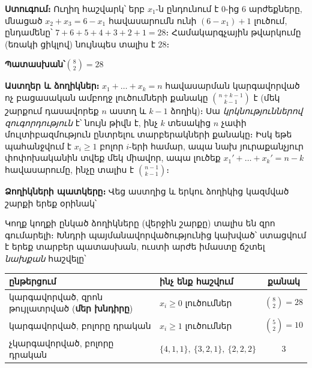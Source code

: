 \documentclass[11pt,a4paper]{article}
\newcommand{\answer}[1]{\begin{answerbox}\centering\textbf{Պատասխան՝}\quad #1\end{answerbox}}
\begin{document}
\textbf{Ստուգում։} Ուղիղ հաշվարկ՝ երբ $x_1$-ն ընդունում է $0$-ից $6$ արժեքները, մնացած
$x_2+x_3=6-x_1$ հավասարումն ունի $(6-x_1)+1$ լուծում, ընդամենը՝ $7+6+5+4+3+2+1=28$։ Համակարգչային
թվարկումը (եռակի ցիկլով) նույնպես տալիս է $28$։ \checkmark

\answer{$\displaystyle \binom{8}{2}=28$}

\begin{methodbox}
\textbf{Աստղեր և ձողիկներ։} $x_1+\dots+x_k=n$ հավասարման կարգավորված ոչ
բացասական ամբողջ լուծումների քանակը $\binom{n+k-1}{k-1}$ է (մեկ շարքում դասավորեք $n$ աստղ
և $k-1$ ձողիկ)։ Սա \emph{կրկնություններով զուգորդություն} է՝ նույն թիվն է, ինչ $k$ տեսակից $n$ չափի
մուլտիբազմություն ընտրելու տարբերակների քանակը։ Իսկ եթե պահանջվում է $x_i\ge 1$ բոլոր $i$-երի
համար, ապա նախ յուրաքանչյուր փոփոխականին տվեք մեկ միավոր, ապա լուծեք $x_1'+\dots+x_k'=n-k$
հավասարումը, ինչը տալիս է $\binom{n-1}{k-1}$։
\end{methodbox}

\medskip
\textbf{Ձողիկների պատկերը։} Վեց աստղից և երկու ձողիկից կազմված շարքի երեք օրինակ՝

\begin{center}
\end{center}
Կողք կողքի ընկած ձողիկները (վերջին շարքը) տալիս են զրո գումարելի։ Խնդրի պայմանավորվածությունից
կախված՝ ստացվում է երեք տարբեր պատասխան, ուստի արժե իմաստը ճշտել \emph{նախքան} հաշվելը՝

\begin{center}
\small
\begin{tabular}{@{}llc@{}}
\toprule
ընթերցում & ինչ ենք հաշվում & քանակ\\
\midrule
կարգավորված, զրոն թույլատրված (\textbf{մեր խնդիրը}) & $x_i\ge 0$ լուծումներ & $\binom{8}{2}=28$\\
կարգավորված, բոլորը դրական & $x_i\ge 1$ լուծումներ & $\binom{5}{2}=10$\\
չկարգավորված, բոլորը դրական & $\{4,1,1\},\ \{3,2,1\},\ \{2,2,2\}$ & $3$\\
\bottomrule
\end{tabular}
\end{center}
\end{document}
